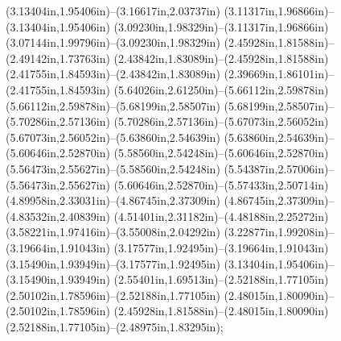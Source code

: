 (3.13404in,1.95406in)--(3.16617in,2.03737in) (3.11317in,1.96866in)--(3.13404in,1.95406in) (3.09230in,1.98329in)--(3.11317in,1.96866in) (3.07144in,1.99796in)--(3.09230in,1.98329in) (2.45928in,1.81588in)--(2.49142in,1.73763in) (2.43842in,1.83089in)--(2.45928in,1.81588in) (2.41755in,1.84593in)--(2.43842in,1.83089in) (2.39669in,1.86101in)--(2.41755in,1.84593in) (5.64026in,2.61250in)--(5.66112in,2.59878in) (5.66112in,2.59878in)--(5.68199in,2.58507in) (5.68199in,2.58507in)--(5.70286in,2.57136in) (5.70286in,2.57136in)--(5.67073in,2.56052in) (5.67073in,2.56052in)--(5.63860in,2.54639in) (5.63860in,2.54639in)--(5.60646in,2.52870in) (5.58560in,2.54248in)--(5.60646in,2.52870in) (5.56473in,2.55627in)--(5.58560in,2.54248in) (5.54387in,2.57006in)--(5.56473in,2.55627in) (5.60646in,2.52870in)--(5.57433in,2.50714in) (4.89958in,2.33031in)--(4.86745in,2.37309in) (4.86745in,2.37309in)--(4.83532in,2.40839in) (4.51401in,2.31182in)--(4.48188in,2.25272in) (3.58221in,1.97416in)--(3.55008in,2.04292in) (3.22877in,1.99208in)--(3.19664in,1.91043in) (3.17577in,1.92495in)--(3.19664in,1.91043in) (3.15490in,1.93949in)--(3.17577in,1.92495in) (3.13404in,1.95406in)--(3.15490in,1.93949in) (2.55401in,1.69513in)--(2.52188in,1.77105in) (2.50102in,1.78596in)--(2.52188in,1.77105in) (2.48015in,1.80090in)--(2.50102in,1.78596in) (2.45928in,1.81588in)--(2.48015in,1.80090in) (2.52188in,1.77105in)--(2.48975in,1.83295in);
